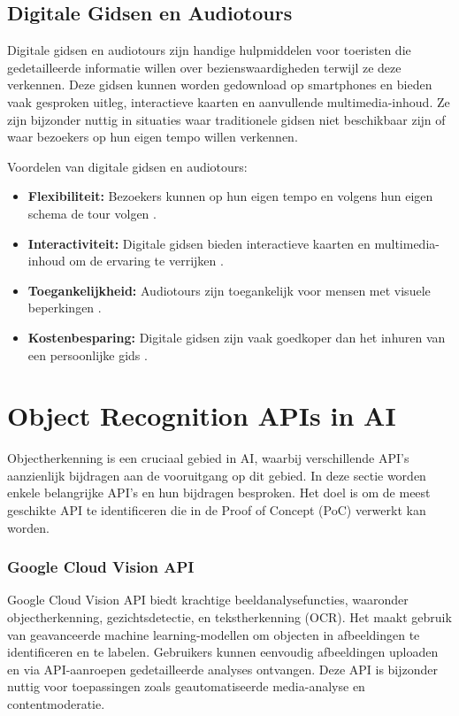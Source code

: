 \subsection{Digitale Gidsen en Audiotours}
Digitale gidsen en audiotours zijn handige hulpmiddelen voor toeristen die gedetailleerde informatie willen over bezienswaardigheden terwijl ze deze verkennen. Deze gidsen kunnen worden gedownload op smartphones en bieden vaak gesproken uitleg, interactieve kaarten en aanvullende multimedia-inhoud. Ze zijn bijzonder nuttig in situaties waar traditionele gidsen niet beschikbaar zijn of waar bezoekers op hun eigen tempo willen verkennen.

Voordelen van digitale gidsen en audiotours:
\begin{itemize}
    \item \textbf{Flexibiliteit:} Bezoekers kunnen op hun eigen tempo en volgens hun eigen schema de tour volgen \autocite{leue2015social}.
    \item \textbf{Interactiviteit:} Digitale gidsen bieden interactieve kaarten en multimedia-inhoud om de ervaring te verrijken \autocite{lee2016understanding}.
    \item \textbf{Toegankelijkheid:} Audiotours zijn toegankelijk voor mensen met visuele beperkingen \autocite{lee2016role}.
    \item \textbf{Kostenbesparing:} Digitale gidsen zijn vaak goedkoper dan het inhuren van een persoonlijke gids \autocite{king2009disney}.
\end{itemize}
\section{Object Recognition APIs in AI}

Objectherkenning is een cruciaal gebied in AI, waarbij verschillende API's aanzienlijk bijdragen aan de vooruitgang op dit gebied. In deze sectie worden enkele belangrijke API's en hun bijdragen besproken. Het doel is om de meest geschikte API te identificeren die in de Proof of Concept (PoC) verwerkt kan worden.


\subsubsection{Google Cloud Vision API}
Google Cloud Vision API biedt krachtige beeldanalysefuncties, waaronder objectherkenning, gezichtsdetectie, en tekstherkenning (OCR). Het maakt gebruik van geavanceerde machine learning-modellen om objecten in afbeeldingen te identificeren en te labelen. Gebruikers kunnen eenvoudig afbeeldingen uploaden en via API-aanroepen gedetailleerde analyses ontvangen. Deze API is bijzonder nuttig voor toepassingen zoals geautomatiseerde media-analyse en contentmoderatie\autocite{google2021vision}.

